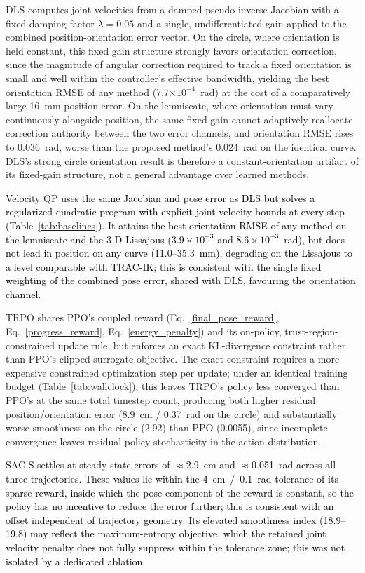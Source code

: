\documentclass[preprint,12pt]{elsarticle}
\begin{document}
DLS computes joint velocities from a damped pseudo-inverse Jacobian with
a fixed damping factor $\lambda = 0.05$ and a single, undifferentiated
gain applied to the combined position-orientation error vector. On the
circle, where orientation is held constant, this fixed gain structure
strongly favors orientation correction, since the magnitude of angular
correction required to track a fixed orientation is small and well within
the controller's effective bandwidth, yielding the best orientation RMSE
of any method (7.7$\times10^{-4}$~rad) at the cost of a comparatively
large 16~mm position error. On the lemniscate, where orientation must
vary continuously alongside position, the same fixed gain cannot
adaptively reallocate correction authority between the two error
channels, and orientation RMSE rises to 0.036~rad, worse than the
proposed method's 0.024~rad on the identical curve. DLS's strong circle
orientation result is therefore a constant-orientation artifact of its
fixed-gain structure, not a general advantage over learned methods.

Velocity QP \textcolor{black}{uses the same Jacobian and pose error as DLS but solves a regularized quadratic program with explicit joint-velocity bounds at every step (Table~\ref{tab:baselines}).} \textcolor{black}{It attains the best orientation RMSE of any method on the lemniscate and the 3-D Lissajous ($3.9\times10^{-3}$ and $8.6\times10^{-3}$~rad), but does not lead in position on any curve (11.0--35.3~mm), degrading on the Lissajous to a level comparable with TRAC-IK; this is consistent with the single fixed weighting of the combined pose error, shared with DLS, favouring the orientation channel.} 


TRPO shares PPO's coupled reward (Eq.~\eqref{final_pose_reward}, Eq.~\eqref{progress_reward}, Eq.~\eqref{energy_penalty}) and its on-policy,
trust-region-constrained update rule, but enforces an exact KL-divergence
constraint rather than PPO's clipped surrogate objective. The exact
constraint requires a more expensive constrained optimization step per
update; under an identical training budget (Table~\ref{tab:wallclock}), this leaves TRPO's
policy less converged than PPO's at the same total timestep count,
producing both higher residual position/orientation error (8.9~cm /
0.37~rad on the circle) and substantially worse smoothness on the circle
(2.92) than PPO (0.0055), since incomplete convergence leaves residual
policy stochasticity in the action distribution.

\textcolor{black}{SAC-S settles at steady-state errors of $\approx$2.9~cm and $\approx$0.051~rad across all three trajectories. These values lie within the 4~cm~/~0.1~rad tolerance of its sparse reward, inside which the pose component of the reward is constant, so the policy has no incentive to reduce the error further; this is consistent with an offset independent of trajectory geometry. Its elevated smoothness index (18.9--19.8) may reflect the maximum-entropy objective, which the retained joint velocity penalty does not fully suppress within the tolerance zone; this was not isolated by a dedicated ablation.}
\end{document}

